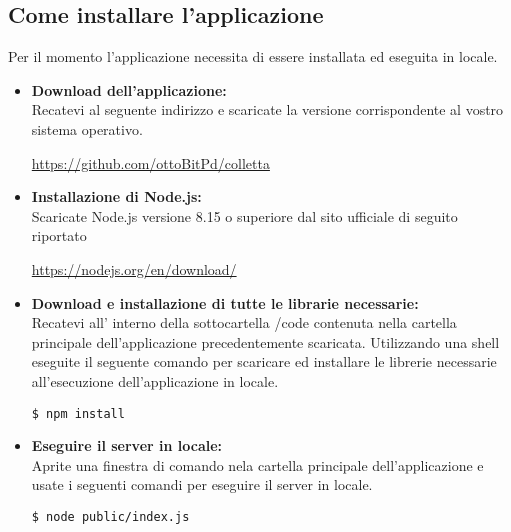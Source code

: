 \subsection{Come installare l'applicazione}
Per il momento l'applicazione necessita di essere installata ed eseguita in locale.
\begin{itemize}
	\item \textbf{Download dell'applicazione:}\\
Recatevi al seguente indirizzo e scaricate la versione corrispondente al vostro sistema operativo.
\begin{center}
	\url{https://github.com/ottoBitPd/colletta} 	
\end{center}


	\item \textbf{Installazione di Node.js:}\\
Scaricate Node.js versione 8.15 o superiore dal sito ufficiale di seguito riportato 
\begin{center}
	\url{https://nodejs.org/en/download/}
\end{center}

	\item \textbf{Download e installazione di tutte le librarie necessarie:}\\ 
Recatevi all' interno della sottocartella /code contenuta nella cartella principale dell'applicazione precedentemente scaricata. Utilizzando una shell eseguite il seguente comando per scaricare ed installare le librerie necessarie all'esecuzione dell'applicazione in locale.

\begin{center}
	\begin{minipage}{0.5\textwidth}
		\begin{lstlisting}[caption=Installazione per l'analisi statica,numbers=none]
			$ npm install
		\end{lstlisting}
	\end{minipage}
\end{center}

	\item \textbf{Eseguire il server in locale:}\\
Aprite una finestra di comando nela cartella principale dell'applicazione e usate i seguenti comandi per eseguire il server in locale.

\begin{center}
	\begin{minipage}{0.5\textwidth}
		\begin{lstlisting}[caption=Avvio della piattaforma,numbers=none]	
			$ node public/index.js
		\end{lstlisting}
	\end{minipage}
\end{center}

\end{itemize}
